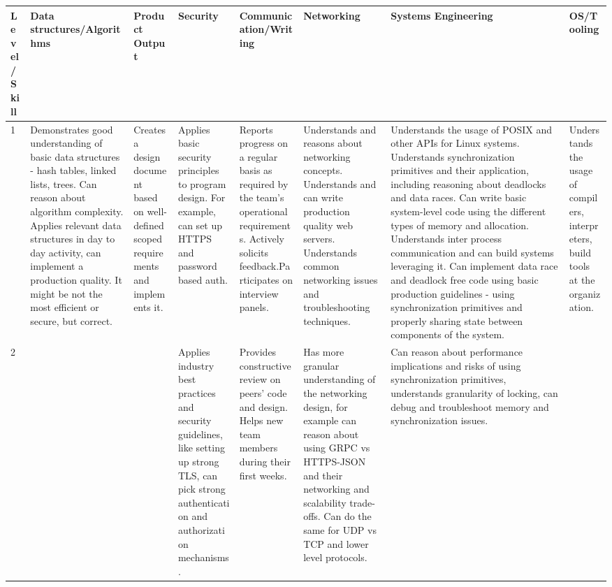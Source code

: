 \documentclass{article}
\begin{document}
\begin{center}
\begin{tabular}{ | m{15em} | m{15em} | m{15em} |  m{15em} | m{15em} |  m{15em} | m{15em} | m{15em} |}
  \hline
  \rowcolor{blue!60!black!10}
  Level/Skill & Data structures/Algorithms & Product Output & Security & Communication/Writing & Networking & Systems Engineering & OS/Tooling \\
  \hline
    1 &
    Demonstrates good understanding of basic data structures - hash tables, linked lists, trees. Can reason about algorithm complexity.
    Applies relevant data structures in day to day activity, can implement a production quality. It might be not the most efficient or secure, but correct. &
    Creates a design document based on well-defined scoped requirements and implements it. &
    Applies basic security principles to program design. For example, can set up HTTPS and password based auth. &
    Reports progress on a regular basis as required by the team's operational requirements. Actively solicits feedback.Participates on interview panels. &
    Understands and reasons about networking concepts. Understands and can write production quality web servers. Understands common networking issues and troubleshooting techniques. &
    Understands the usage of POSIX and other APIs for Linux systems. Understands synchronization primitives and their application, including reasoning about deadlocks and data races.
    Can write basic system-level code using the different types of memory and allocation.
    Understands inter process communication and can build systems leveraging it.
    Can implement data race and deadlock free code using basic production guidelines - using synchronization primitives and properly sharing state between components of the system.&
    Understands the usage of compilers, interpreters, build tools at the organization. \\
  \hline
    2 & & &
    Applies industry best practices and security guidelines, like setting up strong TLS, can pick strong authentication and authorization mechanisms.&
    Provides constructive review on peers' code and design. Helps new team members during their first weeks. &
    Has more granular understanding of the networking design, for example can reason about using GRPC vs HTTPS-JSON and their networking and scalability trade-offs.
    Can do the same for UDP vs TCP and lower level protocols.&
    Can reason about performance implications and risks of using synchronization primitives, understands granularity of locking, can debug and troubleshoot memory and synchronization issues.&

\end{tabular}
\end{center}
\end{document}
